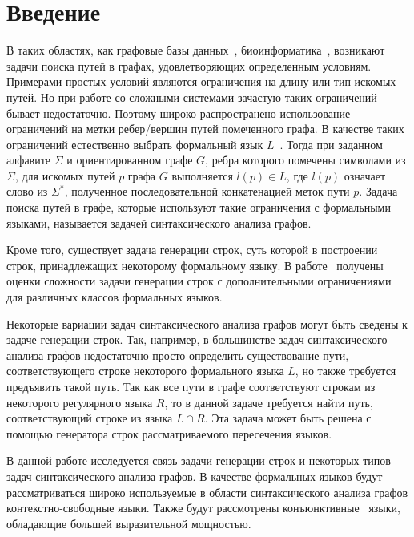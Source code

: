 \section*{Введение}

В таких областях, как графовые базы данных~\cite{azimov-spbu-graphDB, azimov-spbu-zhang}, биоинформатика~\cite{azimov-spbu-Anderson}, возникают задачи поиска путей в графах, удовлетворяющих определенным условиям. Примерами простых условий являются ограничения на длину или тип искомых путей. Но при работе со сложными системами зачастую таких ограничений бывает недостаточно. Поэтому широко распространено использование ограничений на метки ребер/вершин путей помеченного графа. В качестве таких ограничений естественно выбрать формальный язык $L$~\cite{azimov-spbu-barrett}. Тогда при заданном алфавите $\Sigma$ и ориентированном графе $G$, ребра которого помечены символами из $\Sigma$, для искомых путей $p$ графа $G$ выполняется $l(p) \in L$, где $l(p)$ означает слово из $\Sigma^*$, полученное последовательной конкатенацией меток пути $p$. Задача поиска путей в графе, которые используют такие ограничения с формальными языками, называется задачей синтаксического анализа графов.

Кроме того, существует задача генерации строк, суть которой в построении строк, принадлежащих некоторому формальному языку. В работе~\cite{azimov-spbu-Okhotin} получены оценки сложности задачи генерации строк с дополнительными ограничениями для различных классов формальных языков.

Некоторые вариации задач синтаксического анализа графов могут быть сведены к задаче генерации строк. Так, например, в большинстве задач синтаксического анализа графов недостаточно просто определить существование пути, соответствующего строке некоторого формального языка $L$, но также требуется предъявить такой путь. Так как все пути в графе соответствуют строкам из некоторого регулярного языка $R$, то в данной задаче требуется найти путь, соответствующий строке из языка $L \cap R$. Эта задача может быть решена с помощью генератора строк рассматриваемого пересечения языков.

В данной работе исследуется связь задачи генерации строк и некоторых типов задач синтаксического анализа графов. В качестве формальных языков будут рассматриваться широко используемые в области синтаксического анализа графов контекстно-свободные языки. Также будут рассмотрены конъюнктивные~\cite{azimov-spbu-conj} языки, обладающие большей выразительной мощностью.
